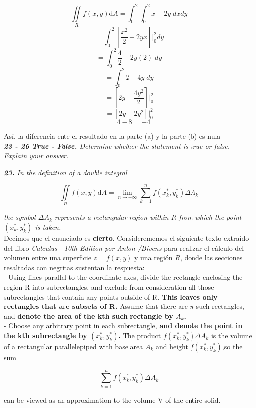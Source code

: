 \documentclass[a4paper,12pt]{article}
\begin{document}
		$$ \iint\limits_{R} f(x,y)\mathrm{d}A = \int_{0}^{2} \int_{0}^{2} x - 2y \; dx dy  $$
		$$  = \int_{0}^{2} [ \frac{x^2}{2} -2yx] \Big|_0^2 dy $$
		$$  = \int_{0}^{2} \frac{4}{2} -2y(2) \; dy $$
		$$  = \int_{0}^{2} 2 - 4y \; dy $$
		$$  = [ 2y - \frac{4y^2}{2}] \Big|_0^2 $$
		$$  = [ 2y - 2y^2 ] \Big|_0^2 $$
		$$  = 4 - 8  = - 4 $$

		Así, la diferencia ente el resultado en la parte (a) y la parte (b) es nula\\

	\textit{\textbf{23 - 26 True - False.} Determine whether the statement is
	true or false. Explain your answer.\\}

	\textit{\textbf{23.} In the definition of a double integral}

		$$  \iint\limits_{R} f(x,y)\mathrm{d}A = \lim\limits_{n \rightarrow + \infty}
		 	\sum_{k=1}^{n} f(x^{*}_{k}, y^{*}_{k}) \Delta A_{k} $$

	\textit{ the symbol $ \Delta A_{k}$ represents a rectangular region within $R$
	 		from which the point $ (x^{*}_{k}, y^{*}_{k}) $ is taken.}\\

	Decimos que el enunciado es \textbf{cierto}. Considerememos el siguiente texto extraído
	del libro \textit{Calculus - 10th Edition por Anton /Bivens} para realizar el
	cálculo del volumen entre una superficie $ z = f(x,y)$ y una región $R$, donde
	las secciones resaltadas con negritas sustentan la respuesta: \\

	- Using lines parallel to the coordinate axes, divide the rectangle
	enclosing the region R into subrectangles, and exclude from consideration
	all those subrectangles that contain any points outside of R.
	\textbf{This leaves only rectangles that are subsets of R.} Assume that there are $n$
	such rectangles, and \textbf{denote the area of the kth such rectangle by $A_k$.} \\

	- Choose any arbitrary point in each subrectangle, \textbf{and denote the point in
	the kth subrectangle by $ (x^{*}_{k}, y^{*}_{k}) $.} The product
	$ f(x^{*}_{k}, y^{*}_{k}) \Delta A_k$  is the volume of a rectangular
	parallelepiped with base area $A_k$ and height $f(x^{*}_{k}, y^{*}_{k})$,so the sum

		$$ \sum_{k=1}^{n} f(x^{*}_{k}, y^{*}_{k}) \Delta A_{k} $$

	can be viewed as an approximation to the volume V of the entire solid.\\
\end{document}
